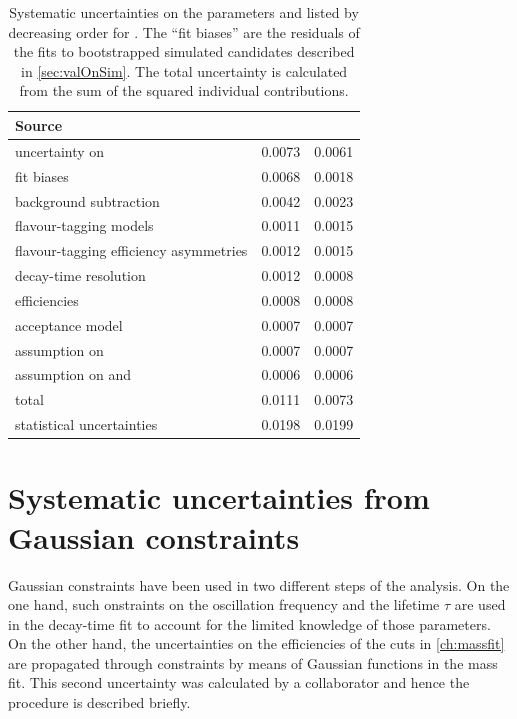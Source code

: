 \begin{table}[tbp]
	\centering
	\caption{Systematic uncertainties on the \CP parameters \Sf and \Sfbar listed by decreasing order for \Sf.
	The \enquote{fit biases} are the residuals of the fits to bootstrapped simulated candidates described in \cref{sec:valOnSim}.
	The total uncertainty is calculated from the sum of the squared individual contributions.}
	\begin{tabular}{lS[table-format=1.4]S[table-format=1.4]}
		\toprule
		Source & \Sf & \Sfbar\\
		\midrule
		uncertainty on \dm 						& 0.0073 & 0.0061 \\
		fit biases 								& 0.0068 & 0.0018 \\
		background subtraction 					& 0.0042 & 0.0023 \\
		flavour-tagging models 					& 0.0011 & 0.0015 \\
		flavour-tagging efficiency asymmetries 	& 0.0012 & 0.0015 \\
		decay-time resolution 					& 0.0012 & 0.0008 \\
		\dllkpi efficiencies 					& 0.0008 & 0.0008 \\
		acceptance model 						& 0.0007 & 0.0007 \\
		assumption on \DG 						& 0.0007 & 0.0007 \\
		assumption on \Cf and \Cfbar 			& 0.0006 & 0.0006 \\
		\midrule
		total 									& 0.0111 & 0.0073 \\
		\midrule
		statistical uncertainties 				& 0.0198 & 0.0199 \\
		\bottomrule
	\end{tabular}
	\label{tab:SystUncertsFull}
\end{table}


\section{Systematic uncertainties from Gaussian constraints}
\label{sec:SystUncertsGauss}

Gaussian constraints have been used in two different steps of the analysis.
On the one hand, such onstraints on the \Bz oscillation frequency \dm and the \Bz lifetime $\tau$ are used in the decay-time fit to account for the limited knowledge of those parameters.
On the other hand, the uncertainties on the efficiencies of the \dllkpi cuts in \cref{ch:massfit} are propagated through constraints by means of Gaussian functions in the mass fit.
This second uncertainty was calculated by a collaborator and hence the procedure is described briefly.

